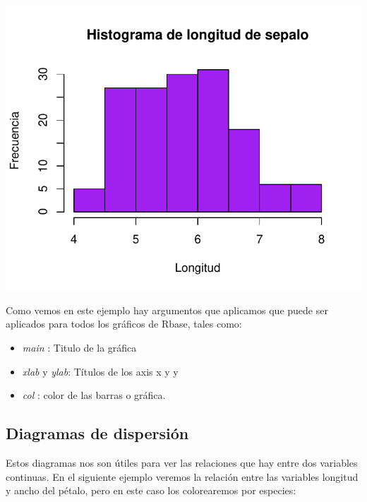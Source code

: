 \documentclass[
]{book}
\newenvironment{Shaded}{\begin{snugshade}}{\end{snugshade}}
\newcommand{\AttributeTok}[1]{\textcolor[rgb]{0.13,0.29,0.53}{#1}}
\newcommand{\FunctionTok}[1]{\textcolor[rgb]{0.13,0.29,0.53}{\textbf{#1}}}
\newcommand{\NormalTok}[1]{#1}
\newcommand{\SpecialCharTok}[1]{\textcolor[rgb]{0.81,0.36,0.00}{\textbf{#1}}}
\newcommand{\StringTok}[1]{\textcolor[rgb]{0.31,0.60,0.02}{#1}}
\begin{document}
\begin{center}\includegraphics{R_Manual_files/figure-latex/unnamed-chunk-191-1} \end{center}

Como vemos en este ejemplo hay argumentos que aplicamos que puede ser aplicados para todos los gráficos de Rbase, tales como:

\begin{itemize}
\item
  \emph{main} : Titulo de la gráfica
\item
  \emph{xlab} y \emph{ylab}: Títulos de los axis x y y
\item
  \emph{col} : color de las barras o gráfica.
\end{itemize}

\subsection{Diagramas de dispersión}\label{diagramas-de-dispersiuxf3n}

Estos diagramas nos son útiles para ver las relaciones que hay entre dos variables continuas.
En el siguiente ejemplo veremos la relación entre las variables longitud y ancho del pétalo, pero en este caso los colorearemos por especies:

\begin{Shaded}
\end{Shaded}
\end{document}
